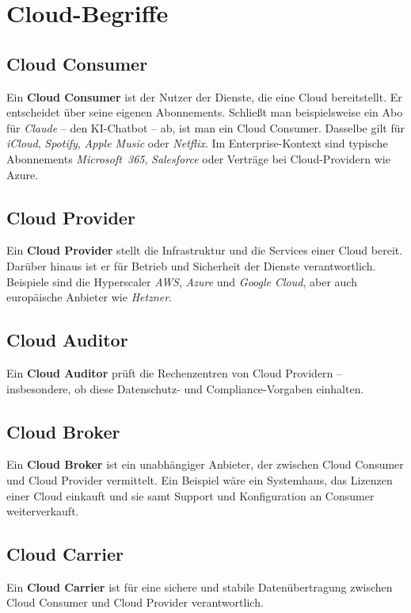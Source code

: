 \section{Cloud-Begriffe}
\subsection{Cloud Consumer}
Ein \textbf{Cloud Consumer} ist der Nutzer der Dienste, die eine Cloud bereitstellt. Er
entscheidet über seine eigenen Abonnements. Schließt man beispielsweise ein Abo
für \textit{Claude} – den KI-Chatbot – ab, ist man ein Cloud Consumer. Dasselbe gilt für
\textit{iCloud}, \textit{Spotify}, \textit{Apple Music} oder \textit{Netflix}. Im Enterprise-Kontext sind typische
Abonnements \textit{Microsoft~365}, \textit{Salesforce} oder Verträge bei Cloud-Providern wie
Azure.
\subsection{Cloud Provider}
Ein \textbf{Cloud Provider} stellt die Infrastruktur und die Services einer Cloud
bereit. Darüber hinaus ist er für Betrieb und Sicherheit der Dienste
verantwortlich. Beispiele sind die Hyperscaler \textit{AWS}, \textit{Azure} und \textit{Google Cloud},
aber auch europäische Anbieter wie \textit{Hetzner}.
\subsection{Cloud Auditor}
Ein \textbf{Cloud Auditor} prüft die Rechenzentren von Cloud Providern – insbesondere,
ob diese Datenschutz- und Compliance-Vorgaben einhalten.
\subsection{Cloud Broker}
Ein \textbf{Cloud Broker} ist ein unabhängiger Anbieter, der zwischen Cloud Consumer und
Cloud Provider vermittelt. Ein Beispiel wäre ein Systemhaus, das Lizenzen einer
Cloud einkauft und sie samt Support und Konfiguration an Consumer
weiterverkauft.
\subsection{Cloud Carrier}
Ein \textbf{Cloud Carrier} ist für eine sichere und stabile Datenübertragung zwischen
Cloud Consumer und Cloud Provider verantwortlich.
